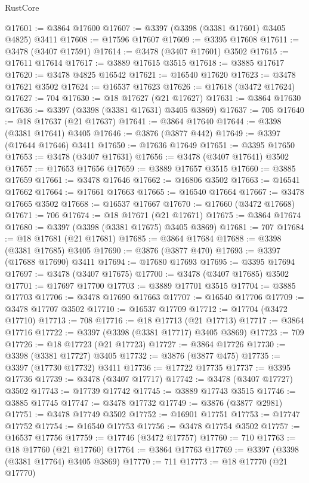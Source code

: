 \begin{lexlean}{RustCore}
\begin{coremodule}
@17601 := @3864 @17600
@17607 := @3397 (@3398 (@3381 @17601) @3405 @4825) @3411
@17608 := @17596 @17607
@17609 := @3395 @17608
@17611 := @3478 (@3407 @17591)
@17614 := @3478 (@3407 @17601) @3502
@17615 := @17611 @17614
@17617 := @3889 @17615 @3515
@17618 := @3885 @17617
@17620 := @3478 @4825 @16542
@17621 := @16540 @17620
@17623 := @3478 @17621 @3502
@17624 := @16537 @17623
@17626 := @17618 (@3472 @17624)
@17627 := 704
@17630 := @18 @17627 (@21 @17627)
@17631 := @3864 @17630
@17636 := @3397 (@3398 (@3381 @17631) @3405 @3869)
@17637 := 705
@17640 := @18 @17637 (@21 @17637)
@17641 := @3864 @17640
@17644 := @3398 (@3381 @17641) @3405
@17646 := @3876 (@3877 @442)
@17649 := @3397 (@17644 @17646) @3411
@17650 := @17636 @17649
@17651 := @3395 @17650
@17653 := @3478 (@3407 @17631)
@17656 := @3478 (@3407 @17641) @3502
@17657 := @17653 @17656
@17659 := @3889 @17657 @3515
@17660 := @3885 @17659
@17661 := @3478 @17646
@17662 := @16806 @3502
@17663 := @16541 @17662
@17664 := @17661 @17663
@17665 := @16540 @17664
@17667 := @3478 @17665 @3502
@17668 := @16537 @17667
@17670 := @17660 (@3472 @17668)
@17671 := 706
@17674 := @18 @17671 (@21 @17671)
@17675 := @3864 @17674
@17680 := @3397 (@3398 (@3381 @17675) @3405 @3869)
@17681 := 707
@17684 := @18 @17681 (@21 @17681)
@17685 := @3864 @17684
@17688 := @3398 (@3381 @17685) @3405
@17690 := @3876 (@3877 @470)
@17693 := @3397 (@17688 @17690) @3411
@17694 := @17680 @17693
@17695 := @3395 @17694
@17697 := @3478 (@3407 @17675)
@17700 := @3478 (@3407 @17685) @3502
@17701 := @17697 @17700
@17703 := @3889 @17701 @3515
@17704 := @3885 @17703
@17706 := @3478 @17690 @17663
@17707 := @16540 @17706
@17709 := @3478 @17707 @3502
@17710 := @16537 @17709
@17712 := @17704 (@3472 @17710)
@17713 := 708
@17716 := @18 @17713 (@21 @17713)
@17717 := @3864 @17716
@17722 := @3397 (@3398 (@3381 @17717) @3405 @3869)
@17723 := 709
@17726 := @18 @17723 (@21 @17723)
@17727 := @3864 @17726
@17730 := @3398 (@3381 @17727) @3405
@17732 := @3876 (@3877 @475)
@17735 := @3397 (@17730 @17732) @3411
@17736 := @17722 @17735
@17737 := @3395 @17736
@17739 := @3478 (@3407 @17717)
@17742 := @3478 (@3407 @17727) @3502
@17743 := @17739 @17742
@17745 := @3889 @17743 @3515
@17746 := @3885 @17745
@17747 := @3478 @17732
@17749 := @3876 (@3877 @2981)
@17751 := @3478 @17749 @3502
@17752 := @16901 @17751
@17753 := @17747 @17752
@17754 := @16540 @17753
@17756 := @3478 @17754 @3502
@17757 := @16537 @17756
@17759 := @17746 (@3472 @17757)
@17760 := 710
@17763 := @18 @17760 (@21 @17760)
@17764 := @3864 @17763
@17769 := @3397 (@3398 (@3381 @17764) @3405 @3869)
@17770 := 711
@17773 := @18 @17770 (@21 @17770)

\end{coremodule}
\end{lexlean}
